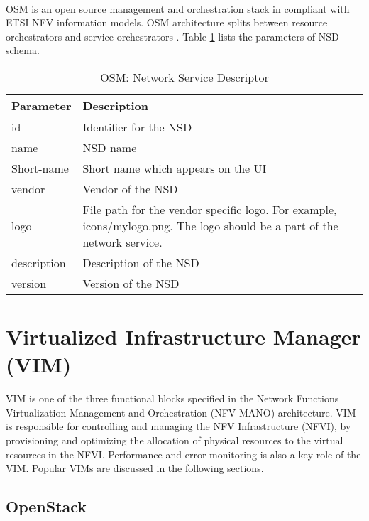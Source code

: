 \paragraph{}
OSM is an open source management and orchestration stack in compliant with ETSI NFV information models. OSM architecture splits between resource orchestrators and service orchestrators \cite{de2018network}. Table \ref{tab:OSM_nsd} lists the parameters of NSD schema. \cite{OSMSchemaDocumentation}
    \begin{table}[h]
        \centering
    \begin{tabular}{ |p{4cm}|p{10cm}|}
        \hline
        \textbf{Parameter} & \textbf{Description} \\
        \hline
         
         id &   Identifier for the NSD \\
         \hline
         name & NSD name \\
         \hline
         Short-name &   Short name which appears on the UI \\
         \hline
         vendor &   Vendor of the NSD \\
         \hline
         logo & File path for the vendor specific logo. For example, icons/mylogo.png. The logo should be a part of the network service. \\
         \hline
         description &  Description of the NSD \\
         \hline
         version &  Version of the NSD \\
         \hline
    \end{tabular}
        \caption{OSM: Network Service Descriptor}
    \label{tab:OSM_nsd}
 \end{table}



\newpage
\section{Virtualized Infrastructure Manager (VIM)}
VIM is one of the three functional blocks specified in the Network Functions Virtualization Management and Orchestration (NFV-MANO) architecture. VIM is responsible for controlling and managing the NFV Infrastructure (NFVI), by provisioning and optimizing the allocation of physical resources to the virtual resources in the NFVI. Performance and error monitoring is also a key role of the VIM. Popular VIMs are discussed in the following sections.
\subsection{OpenStack}
\label{SecOpenStack}
